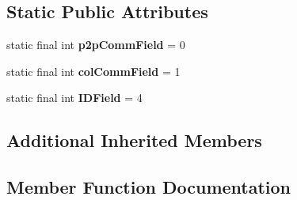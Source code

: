 \subsection*{Static Public Attributes}
\begin{DoxyCompactItemize}
\item 
\hypertarget{classedu_1_1udel_1_1cis_1_1vsl_1_1civl_1_1library_1_1mpi_1_1LibmpiEvaluator_a92f5ed704bf2ae4a94b05c69e297058f}{}static final int {\bfseries p2p\+Comm\+Field} = 0\label{classedu_1_1udel_1_1cis_1_1vsl_1_1civl_1_1library_1_1mpi_1_1LibmpiEvaluator_a92f5ed704bf2ae4a94b05c69e297058f}

\item 
\hypertarget{classedu_1_1udel_1_1cis_1_1vsl_1_1civl_1_1library_1_1mpi_1_1LibmpiEvaluator_a6ad66d2a5996ea857cdfcf7e9e1e7d8b}{}static final int {\bfseries col\+Comm\+Field} = 1\label{classedu_1_1udel_1_1cis_1_1vsl_1_1civl_1_1library_1_1mpi_1_1LibmpiEvaluator_a6ad66d2a5996ea857cdfcf7e9e1e7d8b}

\item 
\hypertarget{classedu_1_1udel_1_1cis_1_1vsl_1_1civl_1_1library_1_1mpi_1_1LibmpiEvaluator_ad37789ad5ab06ef1421cc83592b6d114}{}static final int {\bfseries I\+D\+Field} = 4\label{classedu_1_1udel_1_1cis_1_1vsl_1_1civl_1_1library_1_1mpi_1_1LibmpiEvaluator_ad37789ad5ab06ef1421cc83592b6d114}

\end{DoxyCompactItemize}
\subsection*{Additional Inherited Members}


\subsection{Member Function Documentation}
\hypertarget{classedu_1_1udel_1_1cis_1_1vsl_1_1civl_1_1library_1_1mpi_1_1LibmpiEvaluator_ae7cbc930a6c150151bf958cae7e89355}{}
